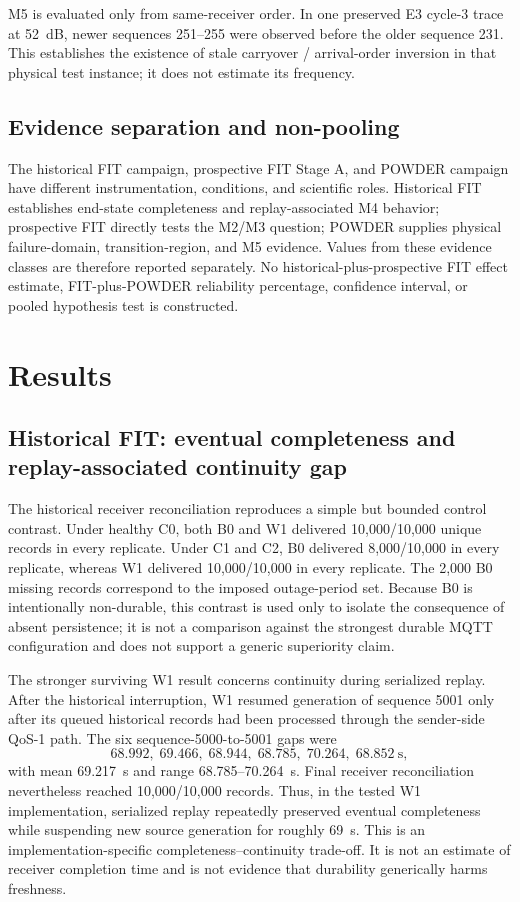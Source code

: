 \documentclass[journal]{IEEEtran}
\begin{document}
M5 is evaluated only from same-receiver order. In one preserved E3 cycle-3 trace at 52~dB, newer sequences 251--255 were observed before the older sequence 231. This establishes the existence of stale carryover / arrival-order inversion in that physical test instance; it does not estimate its frequency.

\subsection{Evidence separation and non-pooling}

The historical FIT campaign, prospective FIT Stage A, and POWDER campaign have different instrumentation, conditions, and scientific roles. Historical FIT establishes end-state completeness and replay-associated M4 behavior; prospective FIT directly tests the M2/M3 question; POWDER supplies physical failure-domain, transition-region, and M5 evidence. Values from these evidence classes are therefore reported separately. No historical-plus-prospective FIT effect estimate, FIT-plus-POWDER reliability percentage, confidence interval, or pooled hypothesis test is constructed.

\section{Results}
\label{sec:results}

\subsection{Historical FIT: eventual completeness and replay-associated continuity gap}

The historical receiver reconciliation reproduces a simple but bounded control contrast. Under healthy C0, both B0 and W1 delivered 10,000/10,000 unique records in every replicate. Under C1 and C2, B0 delivered 8,000/10,000 in every replicate, whereas W1 delivered 10,000/10,000 in every replicate. The 2,000 B0 missing records correspond to the imposed outage-period set. Because B0 is intentionally non-durable, this contrast is used only to isolate the consequence of absent persistence; it is not a comparison against the strongest durable MQTT configuration and does not support a generic superiority claim.

The stronger surviving W1 result concerns continuity during serialized replay. After the historical interruption, W1 resumed generation of sequence 5001 only after its queued historical records had been processed through the sender-side QoS-1 path. The six sequence-5000-to-5001 gaps were
\[
68.992,\;69.466,\;68.944,\;68.785,\;70.264,\;68.852~\mathrm{s},
\]
with mean 69.217~s and range 68.785--70.264~s. Final receiver reconciliation nevertheless reached 10,000/10,000 records. Thus, in the tested W1 implementation, serialized replay repeatedly preserved eventual completeness while suspending new source generation for roughly 69~s. This is an implementation-specific completeness--continuity trade-off. It is not an estimate of receiver completion time and is not evidence that durability generically harms freshness.
\end{document}
